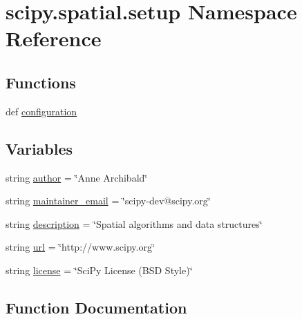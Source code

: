 \hypertarget{namespacescipy_1_1spatial_1_1setup}{}\section{scipy.\+spatial.\+setup Namespace Reference}
\label{namespacescipy_1_1spatial_1_1setup}
\subsection*{Functions}
\begin{DoxyCompactItemize}
\item 
def \hyperlink{namespacescipy_1_1spatial_1_1setup_ae08ff0ef516914b07ead6105ec23e7a1}{configuration}
\end{DoxyCompactItemize}
\subsection*{Variables}
\begin{DoxyCompactItemize}
\item 
string \hyperlink{namespacescipy_1_1spatial_1_1setup_a4e558852d84566a54d34605e52aa66dc}{author} = \char`\"{}Anne Archibald\char`\"{}
\item 
string \hyperlink{namespacescipy_1_1spatial_1_1setup_a2c684b97849fa3e49146010b784715b2}{maintainer\+\_\+email} = \char`\"{}scipy-\/dev@scipy.\+org\char`\"{}
\item 
string \hyperlink{namespacescipy_1_1spatial_1_1setup_ae2e4f77ec54a3635ae1d37cd435a756c}{description} = \char`\"{}Spatial algorithms and data structures\char`\"{}
\item 
string \hyperlink{namespacescipy_1_1spatial_1_1setup_a28becf286a2bc39bca319028faf4a52b}{url} = \char`\"{}http\+://www.\+scipy.\+org\char`\"{}
\item 
string \hyperlink{namespacescipy_1_1spatial_1_1setup_a0eb875f9571630c8c4e7ab48ab0a3213}{license} = \char`\"{}Sci\+Py License (B\+S\+D Style)\char`\"{}
\end{DoxyCompactItemize}


\subsection{Function Documentation}
\hypertarget{namespacescipy_1_1spatial_1_1setup_ae08ff0ef516914b07ead6105ec23e7a1}{}
